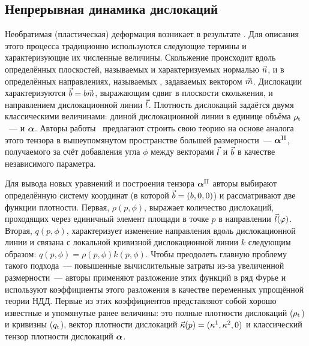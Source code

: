 \documentclass[a4paper, 14pt, titlepage]{extarticle}
\newcommand{\tot}{\textup{t}}    %
\newcommand{\plast}{\textup{pl}} %
\newcommand{\II}{\textup{II}}    %
\begin{document}
  \subsection{Непрерывная динамика дислокаций} %

  Необратимая (пластическая) деформация возникает в результате . Для описания
  этого процесса традиционно используются следующие термины и характеризующие их численные величины. Скольжение
  происходит вдоль определённых плоскостей, называемых  и
  характеризуемых нормалью $\vec{n}$, и в определённых направлениях, называемых , задаваемых вектором $\vec{m}$. Дислокации характеризуются 
  $\vec{b} = b \vec{m}$, выражающим сдвиг в плоскости скольжения, и направлением дислокационной
  линии $\vec{l}$.  Плотность дислокаций задаётся двумя классическими величинами: длиной
  дислокационной линии в единице объёма $\rho_\tot$~---  и
   $\bm{\alpha}$. %
  Авторы работы~\cite{hochrainer-cdd} предлагают строить свою теорию на основе аналога этого тензора
  в вышеупомянутом пространстве большей размерности~---  $\matx{\alpha}^\II$, получаемого за счёт добавления угла $\phi$ между векторами $\vec{l}$ и
  $\vec{b}$ в качестве независимого параметра.

  Для вывода новых уравнений и построения тензора $\matx{\alpha}^\II$ авторы выбирают определённую
  систему координат (в которой $\vec{b} = (b,0,0)$) и рассматривают две функции плотности.
  Первая, $\rho(p,\phi)$, выражает количество дислокаций, проходящих через единичный элемент площади в
  точке $p$ в направлении $\vec{l}(\varphi)$. Вторая,  $q(p,\phi)$,
  характеризует изменение направления вдоль дислокационной линии и связана с локальной кривизной
  дислокационной линии $k$ следующим образом: $q(p,\phi) = \rho(p, \phi) k(p, \phi)$.
  Чтобы преодолеть главную проблему такого подхода~--- повышенные вычислительные затраты из-за
  увеличенной размерности~--- авторы применяют разложение этих функций в ряд Фурье и используют
  коэффициенты этого разложения в качестве переменных упрощённой теории НДД.
  Первые из этих коэффициентов представляют собой хорошо известные и упомянутые ранее величины: это
  полные плотности дислокаций ($\rho_\tot$) и кривизны ($q_\tot$), вектор плотности дислокаций
  $\vec{\kappa}(p) = (\kappa^1,\kappa^2,0)$ и классический тензор плотности дислокаций $\bm{\alpha}$.
\end{document}
